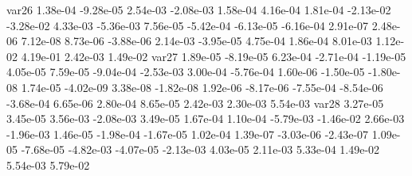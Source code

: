 var26  1.38e-04 -9.28e-05  2.54e-03 -2.08e-03  1.58e-04  4.16e-04  1.81e-04 -2.13e-02 -3.28e-02  4.33e-03 -5.36e-03  7.56e-05 -5.42e-04 -6.13e-05 -6.16e-04  2.91e-07  2.48e-06  7.12e-08  8.73e-06 -3.88e-06  2.14e-03 -3.95e-05  4.75e-04  1.86e-04  8.01e-03  1.12e-02  4.19e-01  2.42e-03  1.49e-02
var27  1.89e-05 -8.19e-05  6.23e-04 -2.71e-04 -1.19e-05  4.05e-05  7.59e-05 -9.04e-04 -2.53e-03  3.00e-04 -5.76e-04  1.60e-06 -1.50e-05 -1.80e-08  1.74e-05 -4.02e-09  3.38e-08 -1.82e-08  1.92e-06 -8.17e-06 -7.55e-04 -8.54e-06 -3.68e-04  6.65e-06  2.80e-04  8.65e-05  2.42e-03  2.30e-03  5.54e-03
var28  3.27e-05  3.45e-05  3.56e-03 -2.08e-03  3.49e-05  1.67e-04  1.10e-04 -5.79e-03 -1.46e-02  2.66e-03 -1.96e-03  1.46e-05 -1.98e-04 -1.67e-05  1.02e-04  1.39e-07 -3.03e-06 -2.43e-07  1.09e-05 -7.68e-05 -4.82e-03 -4.07e-05 -2.13e-03  4.03e-05  2.11e-03  5.33e-04  1.49e-02  5.54e-03  5.79e-02



